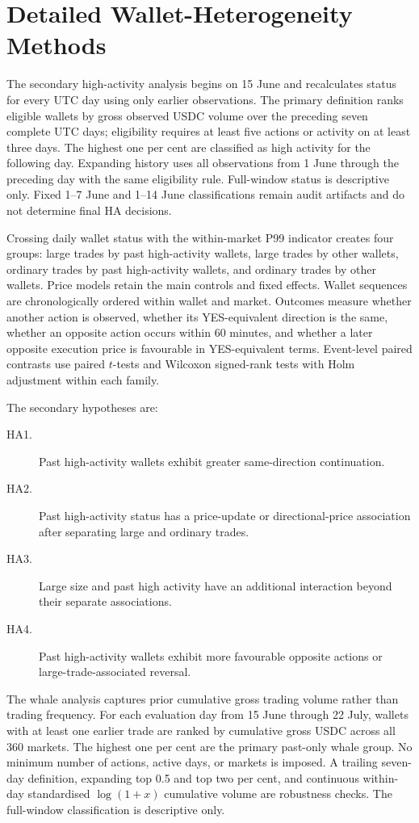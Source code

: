 \section{Detailed Wallet-Heterogeneity Methods}
\label{sec:wallet-methods-appendix}

The secondary high-activity analysis begins on 15 June and recalculates status
for every UTC day using only earlier observations. The primary definition ranks
eligible wallets by gross observed USDC volume over the preceding seven complete
UTC days; eligibility requires at least five actions or activity on at least
three days. The highest one per cent are classified as high activity for the
following day. Expanding history uses all observations from 1 June through the
preceding day with the same eligibility rule. Full-window status is descriptive
only. Fixed 1--7 June and 1--14 June classifications remain audit artifacts and
do not determine final HA decisions.

Crossing daily wallet status with the within-market P99 indicator creates four
groups: large trades by past high-activity wallets, large trades by other
wallets, ordinary trades by past high-activity wallets, and ordinary trades by
other wallets. Price models retain the main controls and fixed effects. Wallet
sequences are chronologically ordered within wallet and market. Outcomes measure
whether another action is observed, whether its YES-equivalent direction is the
same, whether an opposite action occurs within 60 minutes, and whether a later
opposite execution price is favourable in YES-equivalent terms. Event-level
paired contrasts use paired $t$-tests and Wilcoxon signed-rank tests with Holm
adjustment within each family.

The secondary hypotheses are:
\begin{description}
  \item[HA1.] Past high-activity wallets exhibit greater same-direction continuation.
  \item[HA2.] Past high-activity status has a price-update or directional-price association after separating large and ordinary trades.
  \item[HA3.] Large size and past high activity have an additional interaction beyond their separate associations.
  \item[HA4.] Past high-activity wallets exhibit more favourable opposite actions or large-trade-associated reversal.
\end{description}

The whale analysis captures prior cumulative gross trading volume rather than trading
frequency. For each evaluation day from 15 June through 22 July, wallets with at
least one earlier trade are ranked by cumulative gross USDC across all 360
markets. The highest one per cent are the primary past-only whale group. No
minimum number of actions, active days, or markets is imposed. A trailing
seven-day definition, expanding top 0.5 and top two per cent, and continuous
within-day standardised $\log(1+x)$ cumulative volume are robustness checks.
The full-window classification is descriptive only.


